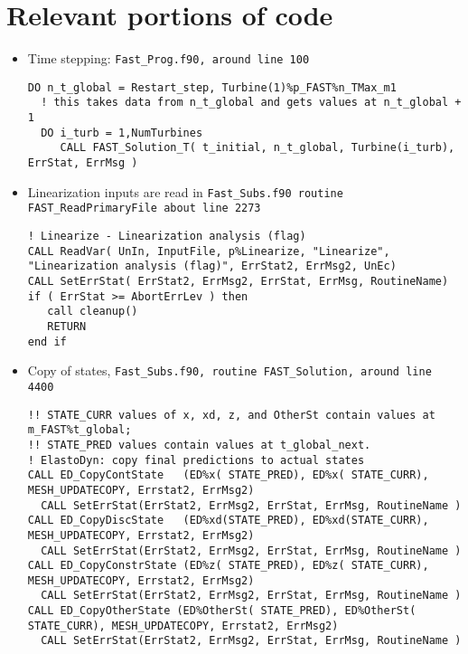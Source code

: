 % 









\section{Relevant portions of code}
\fortran
\begin{itemize}
    \item Time stepping: \tt{Fast\_Prog.f90}, around line 100 
\begin{lstlisting}
DO n_t_global = Restart_step, Turbine(1)%p_FAST%n_TMax_m1 
  ! this takes data from n_t_global and gets values at n_t_global + 1
  DO i_turb = 1,NumTurbines
     CALL FAST_Solution_T( t_initial, n_t_global, Turbine(i_turb), ErrStat, ErrMsg )
 \end{lstlisting}

\item Linearization inputs are read in \tt{Fast\_Subs.f90} routine \tt{FAST\_ReadPrimaryFile} about line 2273

\begin{lstlisting}
! Linearize - Linearization analysis (flag)
CALL ReadVar( UnIn, InputFile, p%Linearize, "Linearize", "Linearization analysis (flag)", ErrStat2, ErrMsg2, UnEc)
CALL SetErrStat( ErrStat2, ErrMsg2, ErrStat, ErrMsg, RoutineName)
if ( ErrStat >= AbortErrLev ) then
   call cleanup()
   RETURN        
end if      
\end{lstlisting}

\item Copy of states, \tt{Fast\_Subs.f90}, routine \tt{FAST\_Solution}, around line 4400
\begin{lstlisting}
!! STATE_CURR values of x, xd, z, and OtherSt contain values at m_FAST%t_global;
!! STATE_PRED values contain values at t_global_next.
! ElastoDyn: copy final predictions to actual states
CALL ED_CopyContState   (ED%x( STATE_PRED), ED%x( STATE_CURR), MESH_UPDATECOPY, Errstat2, ErrMsg2)
  CALL SetErrStat(ErrStat2, ErrMsg2, ErrStat, ErrMsg, RoutineName )
CALL ED_CopyDiscState   (ED%xd(STATE_PRED), ED%xd(STATE_CURR), MESH_UPDATECOPY, Errstat2, ErrMsg2)  
  CALL SetErrStat(ErrStat2, ErrMsg2, ErrStat, ErrMsg, RoutineName )
CALL ED_CopyConstrState (ED%z( STATE_PRED), ED%z( STATE_CURR), MESH_UPDATECOPY, Errstat2, ErrMsg2)      
  CALL SetErrStat(ErrStat2, ErrMsg2, ErrStat, ErrMsg, RoutineName )
CALL ED_CopyOtherState (ED%OtherSt( STATE_PRED), ED%OtherSt( STATE_CURR), MESH_UPDATECOPY, Errstat2, ErrMsg2)      
  CALL SetErrStat(ErrStat2, ErrMsg2, ErrStat, ErrMsg, RoutineName )
 \end{lstlisting}
      

\end{itemize}

